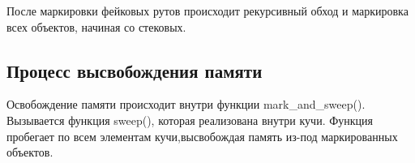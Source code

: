После маркировки фейковых рутов происходит рекурсивный обход и маркировка всех объектов, начиная со стековых.

\subsection{Процесс высвобождения памяти}

Освобождение памяти происходит внутри функции mark\_and\_sweep(). Вызывается функция sweep(), которая реализована внутри кучи. Функция пробегает по всем элементам кучи,высвобождая память из-под маркированных объектов.